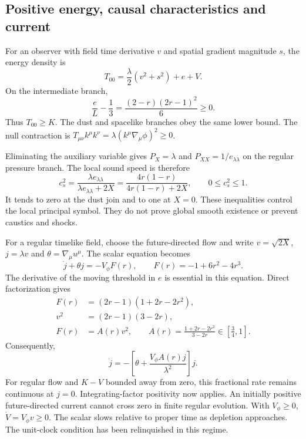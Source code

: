 \documentclass[11pt]{article}
\begin{document}
\subsection{Positive energy, causal characteristics and current}
For an observer with field time derivative $v$ and spatial gradient magnitude
$s$, the energy density is
\begin{equation}
 T_{00}=\frac{\lambda}{2}(v^2+s^2)+e+V.
\end{equation}
On the intermediate branch,
\begin{equation}
 \frac{e}{L}-\frac13=\frac{(2-r)(2r-1)^2}{6}\ge0.
\end{equation}
Thus $T_{00}\ge K$. The dust and spacelike branches obey the same lower
bound. The null contraction is $T_{\mu\nu}k^\mu k^\nu
=\lambda(k^\mu\nabla_\mu\phi)^2\ge0$.

Eliminating the auxiliary variable gives $P_X=\lambda$ and
$P_{XX}=1/e_{\lambda\lambda}$ on the regular pressure branch.
The local sound speed is therefore\cite{Garriga}
\begin{equation}\label{eq:sound}
 c_s^2=\frac{\lambda e_{\lambda\lambda}}
 {\lambda e_{\lambda\lambda}+2X}
 =\frac{4r(1-r)}{4r(1-r)+2X},\qquad 0\le c_s^2\le1.
\end{equation}
It tends to zero at the dust join and to one at $X=0$. These inequalities
control the local principal symbol. They do not prove global smooth
existence or prevent caustics and shocks.

For a regular timelike field, choose the future-directed flow and write
$v=\sqrt{2X}$, $j=\lambda v$ and $\theta=\nabla_\mu u^\mu$.
The scalar equation becomes
\begin{equation}\label{eq:current}
 \dot j+\theta j=-V_\phi F(r),\qquad
 F(r)=-1+6r^2-4r^3.
\end{equation}
The derivative of the moving threshold in $e$ is essential in this equation.
Direct factorization gives
\begin{align}
 F(r)&=(2r-1)(1+2r-2r^2),\\
 v^2&=(2r-1)(3-2r),\\
 F(r)&=A(r)v^2,\qquad
 A(r)=\frac{1+2r-2r^2}{3-2r}\in[\tfrac34,1].
\end{align}
Consequently,
\begin{equation}\label{eq:regular}
 \dot j=-\left[\theta+\frac{V_\phi A(r)j}{\lambda^2}\right]j.
\end{equation}
For regular flow and $K-V$ bounded away from zero, this fractional rate
remains continuous at $j=0$. Integrating-factor positivity now applies.
An initially positive future-directed current cannot cross zero in finite
regular evolution. With $V_\phi\ge0$, $\dot V=V_\phi v\ge0$.
The scalar slows relative to proper time as depletion approaches. The
unit-clock condition has been relinquished in this regime.
\end{document}
